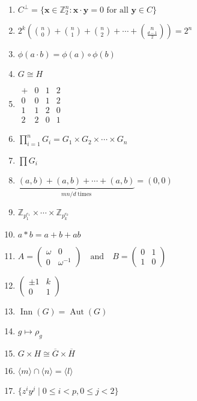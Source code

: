 \documentclass[oneside,10pt,]{article}
\newcommand{\inn}{\operatorname{Inn}}
\newcommand{\aut}{\operatorname{Aut}}
\newcommand{\lt}{<}
\begin{document}
\begin{enumerate}
\item{}\(\displaystyle C^\perp = \{ {\mathbf x} \in {\mathbb Z}_2^n : {\mathbf x} \cdot {\mathbf y} = 0 \text{ for all } {\mathbf y} \in C \}\)%
\item{}\(\displaystyle 2^k\left({n\choose 0} + {n\choose 1} + {n\choose 2} + \cdots + {n\choose \frac{d-1}{2}}\right) = 2^n\)%
\item{}\(\displaystyle \phi( a \cdot b) = \phi( a) \circ \phi( b)\)%
\item{}\(\displaystyle G \cong H\)%
\item{}\(\displaystyle \begin{array}{c|ccc} + & 0 & 1 & 2 \\ \hline 0 & 0 & 1 & 2 \\ 1 & 1 & 2 & 0 \\ 2 & 2 & 0 & 1 \end{array}\)%
\item{}\(\displaystyle \prod_{i = 1}^n G_i = G_1 \times G_2 \times \cdots \times G_n\)%
\item{}\(\displaystyle \prod G_i\)%
\item{}\(\displaystyle \underbrace{(a,b) + (a,b)+ \cdots + (a,b)}_{mn/d \; \text{times}} = (0, 0)\)%
\item{}\(\displaystyle {\mathbb Z}_{p_1^{e_1}} \times \cdots \times {\mathbb Z}_{p_k^{e_k}}\)%
\item{}\(\displaystyle a \ast b = a + b + ab\)%
\item{}\(\displaystyle A = \begin{pmatrix} \omega & 0 \\ 0 & \omega^{-1} \end{pmatrix} \quad \text{and} \quad B = \begin{pmatrix} 0 & 1 \\ 1 & 0 \end{pmatrix}\)%
\item{}\(\displaystyle \begin{pmatrix} \pm 1 & k \\ 0 & 1 \end{pmatrix}\)%
\item{}\(\displaystyle \inn(G) = \aut(G)\)%
\item{}\(\displaystyle g \mapsto \rho_g\)%
\item{}\(\displaystyle G \times H \cong \overline{G} \times \overline{H}\)%
\item{}\(\displaystyle \langle m \rangle \cap \langle n \rangle = \langle l \rangle\)%
\item{}\(\displaystyle \{z^iy^j\mid 0\leq i \lt p, 0\leq j \lt 2\}\)%

\end{enumerate}
\end{document}
